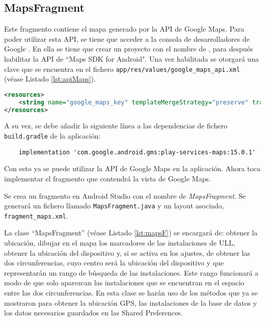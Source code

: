 \subsection{MapsFragment}
       
Este fragmento contiene el mapa generado por la API de Google Maps. Para poder utilizar esta API, se tiene que acceder a la consola de desarrolladores de Google \cite{URL::consoleGoogle}. En ella se tiene que crear un proyecto con el nombre de \ULLAR{}, para después habilitar la API de ``Maps SDK for Android". Una vez habilitada se otorgará una clave que se encuentra en el fichero \texttt{app/res/values/google\_maps\_api.xml} (véase Listado \ref{lst:apiMaps}).

\begin{lstlisting}[stringstyle=\color{purple},language=XML,caption={Fichero \texttt{google\_maps\_api.xml}.},  label={lst:apiMaps}]
<resources>
    <string name="google_maps_key" templateMergeStrategy="preserve" translatable="false">API_Maps</string>
</resources>
\end{lstlisting}
 
A su vez, se debe añadir la siguiente línea a las dependencias de fichero \texttt{build.gradle} de la aplicación:
 
\begin{lstlisting}
    implementation 'com.google.android.gms:play-services-maps:15.0.1'
\end{lstlisting}

Con esto ya se puede utilizar la API de Google Maps en la aplicación. Ahora toca implementar el fragmento que contendrá la vista de Google Maps. 

Se crea un fragmento en Android Studio con el nombre de \textit{MapsFragment}. Se generará un fichero llamado \texttt{MapsFragment.java} y un layout asociado, \texttt{fragment\_maps.xml}.

La clase ``MapsFragment'' (véase Listado \ref{lst:mapsF}) se encargará de: obtener la ubicación, dibujar en el mapa los marcadores de las instalaciones de ULL, obtener la ubicación del dispositivo y, si se activa en los ajustes, de obtener las dos circunferencias, cuyo centro será la ubicación del dispositivo y que representarán un rango de búsqueda de las instalaciones. Este rango funcionará a modo de que solo aparezcan las instalaciones que se encuentran en el espacio entre las dos circunferencias. En esta clase se harán uso de los métodos que ya se mostraron para obtener la ubicación GPS, las instalaciones de la base de datos y los datos necesarios guardados en las Shared Preferences.   

